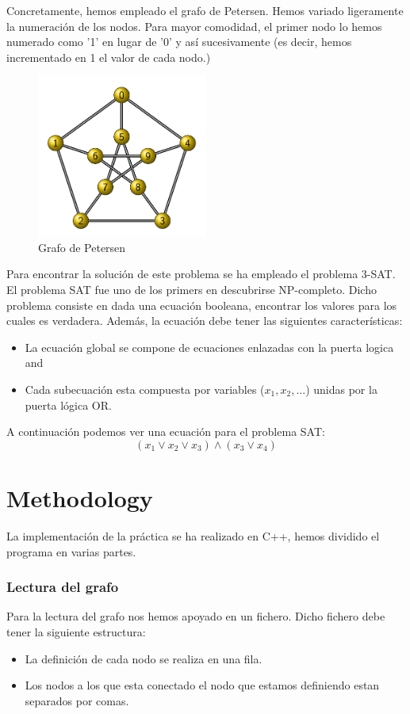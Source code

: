 \documentclass{article}
\begin{document}
	Concretamente, hemos empleado el grafo de Petersen. Hemos variado ligeramente 
    la numeración de los nodos. Para mayor comodidad, el primer nodo lo hemos numerado como '1' en lugar de '0' y así sucesivamente (es decir, 
    hemos incrementado en 1 el valor de cada nodo.)

    \begin{figure}[H]
        \centering
        \includegraphics[width=0.5\textwidth]{pictures/PetersenGraph.png}
        \caption{Grafo de Petersen}
    \end{figure}

    Para encontrar la solución de este problema se ha empleado el problema 3-SAT. 
    El problema SAT fue uno de los primers en descubrirse NP-completo. Dicho problema consiste 
    en dada una ecuación booleana, encontrar los valores para los cuales es verdadera. Además, la 
    ecuación debe tener las siguientes características: 
    \begin{itemize}
        \item La ecuación global se compone de ecuaciones enlazadas con la puerta logica and
        \item Cada subecuación esta compuesta por variables ($x_1, x_2, ...$) unidas por la puerta lógica OR.
    \end{itemize}

    A continuación podemos ver una ecuación para el problema SAT:
        \[ ( x_1 \vee x_2 \vee x_3) \wedge (x_3 \vee x_4)\]

    
\section{Methodology}
    La implementación de la práctica se ha realizado en C++, hemos dividido el programa en varias partes. 
    \subsubsection{Lectura del grafo}
        Para la lectura del grafo nos hemos apoyado en un fichero. Dicho fichero debe tener la siguiente estructura:
        \begin{itemize}
            \item La definición de cada nodo se realiza en una fila. 
            \item Los nodos a los que esta conectado el nodo que estamos definiendo estan separados por comas. 
        \end{itemize}
        
\end{document}
